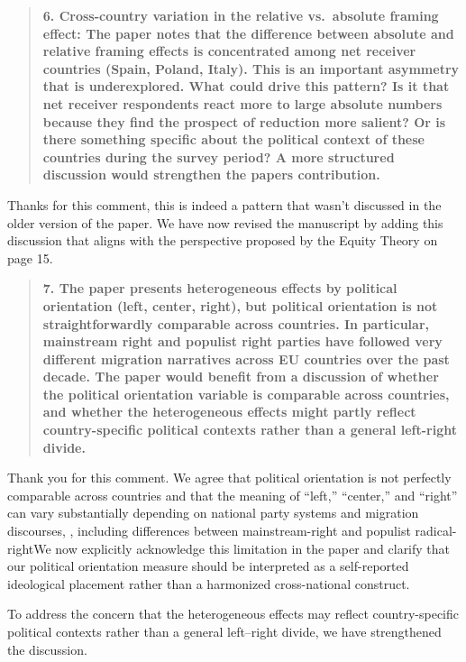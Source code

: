 \documentclass[
  11pt,
]{article}
\begin{document}
\begin{quote}
\textbf{6. Cross-country variation in the relative vs.~absolute framing effect: The paper notes that the difference between absolute and relative framing effects is concentrated among net receiver countries (Spain, Poland, Italy). This is an important asymmetry that is underexplored. What could drive this pattern? Is it that net receiver respondents react more to large absolute numbers because they find the prospect of reduction more salient? Or is there something specific about the political context of these countries during the survey period? A more structured discussion would strengthen the paper\textquotesingle s contribution.}
\end{quote}

Thanks for this comment, this is indeed a pattern that wasn't discussed in the older version of the paper. We have now revised the manuscript by adding this discussion that aligns with the perspective proposed by the Equity Theory on page 15.

\begin{quote}
\textbf{7. The paper presents heterogeneous effects by political orientation (left, center, right), but political orientation is not straightforwardly comparable across countries. In particular, mainstream right and populist right parties have followed very different migration narratives across EU countries over the past decade. The paper would benefit from a discussion of whether the political orientation variable is comparable across countries, and whether the heterogeneous effects might partly reflect country-specific political contexts rather than a general left-right divide.}
\end{quote}

Thank you for this comment. We agree that political orientation is not
perfectly comparable across countries and that the meaning of ``left,''
``center,'' and ``right'' can vary substantially depending on national party
systems and migration discourses, , including differences between
mainstream-right and populist radical-rightWe now explicitly acknowledge
this limitation in the paper and clarify that our political orientation
measure should be interpreted as a self-reported ideological placement
rather than a harmonized cross-national construct.

To address the concern that the heterogeneous effects may reflect
country-specific political contexts rather than a general left--right
divide, we have strengthened the discussion.
\end{document}
